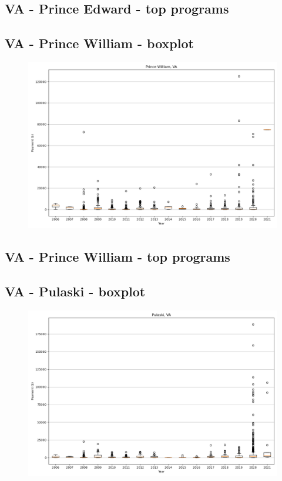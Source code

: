 \subsection*{VA - Prince Edward - top programs}

\newpage
\subsection*{VA - Prince William - boxplot}
\begin{figure}[h]
\centering
\includegraphics[width=7in]{../output/boxplots/counties/Prince William-VA_boxplot.png}
\end{figure}


\subsection*{VA - Prince William - top programs}

\newpage
\subsection*{VA - Pulaski - boxplot}
\begin{figure}[h]
\centering
\includegraphics[width=7in]{../output/boxplots/counties/Pulaski-VA_boxplot.png}
\end{figure}


